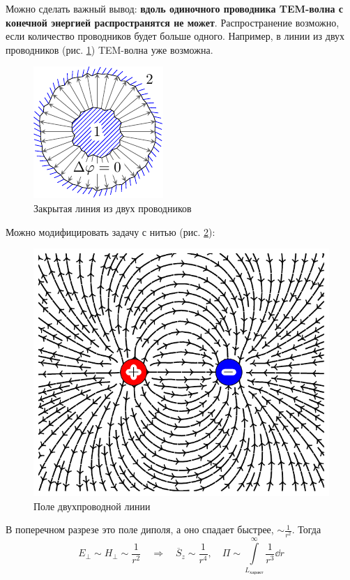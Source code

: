 \documentclass[a4paper,14pt]{extarticle}
\begin{document}
Можно сделать важный вывод: \textbf{вдоль одиночного проводника TEM-волна с конечной энергией распространятся не может}. Распространение возможно, если количество проводников будет больше одного. Например, в линии из двух проводников (рис. \ref{fig:lect4:4}) TEM-волна уже возможна.

\begin{figure}[h!]
	\centering
	\includegraphics[scale=1.5]{img/lect4_ris4}
	\caption{Закрытая линия из двух проводников}
	\label{fig:lect4:4}
\end{figure}

Можно модифицировать задачу с нитью (рис. \ref{fig:lect4:5}):

\begin{figure}[h!]
	\centering
	\includegraphics[scale=0.7]{img/lect4_ris5}
	\caption{Поле двухпроводной линии}
	\label{fig:lect4:5}
\end{figure}

В поперечном разрезе это поле диполя, а оно спадает быстрее, $\sim \frac{1}{r^2}$. Тогда
\begin{equation*}
E_\perp\sim H_\perp \sim \frac{1}{r^2}
\quad \Rightarrow \quad
\overline{S}_z \sim \frac{1}{r^4}, \quad
\Pi \sim \int\limits_{L_\text{характ}}^\infty \frac{1}{r^3} \dd{r}
\end{equation*}
\end{document}
